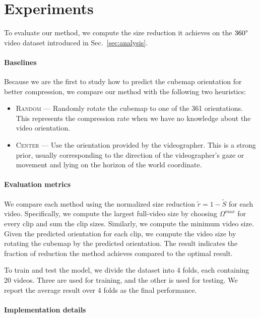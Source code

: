 \documentclass[journal,transmag]{IEEEtran}
\begin{document}
\section{Experiments}
\label{sec:experiments}


To evaluate our method,
we compute the size reduction it achieves on the $360\degree$ video dataset introduced in Sec.~\ref{sec:analysis}.

\paragraph{Baselines}\label{par:baselines}

Because we are the first to study how to predict the cubemap orientation for better compression,
we compare our method with the following two heuristics:
\begin{itemize}[leftmargin=*,label=$\bullet$]
    \item \textsc{Random} --- Randomly rotate the cubemap to one of the 361 orientations.
        This represents the compression rate when we have no knowledge about the video orientation.
    \item \textsc{Center} --- Use the orientation provided by the videographer.
        This is a strong prior, usually corresponding to the direction of the videographer's gaze or movement and lying on the horizon of the world coordinate.
\end{itemize}\paragraph{Evaluation metrics}\label{par:evaluation_metrics}

We compare each method using the normalized size reduction $\tilde{r} = 1 - \tilde{S}$ for each video.
Specifically, we compute the largest full-video size by choosing $\Omega^{max}$ for every clip and sum the clip sizes.
Similarly, we compute the minimum video size.
Given the predicted orientation for each clip,
we compute the video size by rotating the cubemap by the predicted orientation.
The result indicates the fraction of reduction the method achieves compared to the optimal result.

To train and test the model,
we divide the dataset into 4 folds, each containing 20 videos.
Three are used for training, and the other is used for testing.
We report the average result over 4 folds as the final performance.

\paragraph{Implementation details}\label{par:implementation_details}
\end{document}
